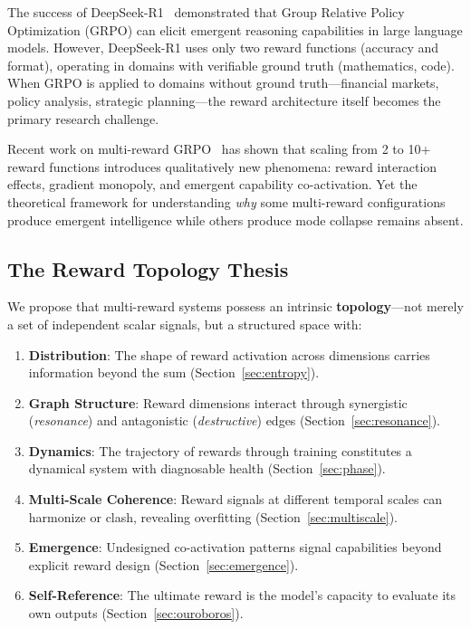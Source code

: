 \documentclass{article}
\begin{document}
The success of DeepSeek-R1~\cite{guo2025deepseek} demonstrated that Group Relative Policy Optimization (GRPO) can elicit emergent reasoning capabilities in large language models. However, DeepSeek-R1 uses only two reward functions (accuracy and format), operating in domains with verifiable ground truth (mathematics, code). When GRPO is applied to domains without ground truth---financial markets, policy analysis, strategic planning---the reward architecture itself becomes the primary research challenge.

Recent work on multi-reward GRPO~\cite{ji2026reflexive} has shown that scaling from 2 to 10+ reward functions introduces qualitatively new phenomena: reward interaction effects, gradient monopoly, and emergent capability co-activation. Yet the theoretical framework for understanding \emph{why} some multi-reward configurations produce emergent intelligence while others produce mode collapse remains absent.

\subsection{The Reward Topology Thesis}

We propose that multi-reward systems possess an intrinsic \textbf{topology}---not merely a set of independent scalar signals, but a structured space with:

\begin{enumerate}
    \item \textbf{Distribution}: The shape of reward activation across dimensions carries information beyond the sum (Section~\ref{sec:entropy}).
    \item \textbf{Graph Structure}: Reward dimensions interact through synergistic (\emph{resonance}) and antagonistic (\emph{destructive}) edges (Section~\ref{sec:resonance}).
    \item \textbf{Dynamics}: The trajectory of rewards through training constitutes a dynamical system with diagnosable health (Section~\ref{sec:phase}).
    \item \textbf{Multi-Scale Coherence}: Reward signals at different temporal scales can harmonize or clash, revealing overfitting (Section~\ref{sec:multiscale}).
    \item \textbf{Emergence}: Undesigned co-activation patterns signal capabilities beyond explicit reward design (Section~\ref{sec:emergence}).
    \item \textbf{Self-Reference}: The ultimate reward is the model's capacity to evaluate its own outputs (Section~\ref{sec:ouroboros}).
\end{enumerate}
\end{document}
